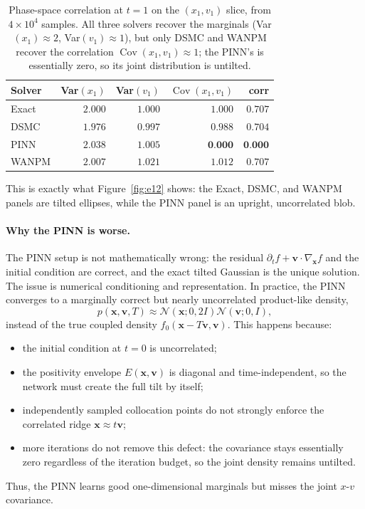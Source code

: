 \documentclass[11pt]{article}
\newcommand{\grad}{\nabla}
\newcommand{\vx}{\mathbf{x}}
\newcommand{\vv}{\mathbf{v}}
\theoremstyle{plain}
\begin{document}
\begin{table}[H]
\centering
\caption{Phase-space correlation at $t=1$ on the $(x_1,v_1)$ slice, from $4\times10^4$ samples.
All three solvers recover the marginals (Var$(x_1)\!\approx\!2$, Var$(v_1)\!\approx\!1$), but
only DSMC and WANPM recover the correlation $\operatorname{Cov}(x_1,v_1)\!\approx\!1$; the PINN's
is essentially zero, so its joint distribution is untilted.}
\label{tab:corr}
\small
\begin{tabular}{lrrrr}
\toprule
Solver & Var$(x_1)$ & Var$(v_1)$ & $\operatorname{Cov}(x_1,v_1)$ & corr\\
\midrule
Exact  & $2.000$ & $1.000$ & $1.000$  & $0.707$\\
DSMC   & $1.976$ & $0.997$ & $0.988$  & $0.704$\\
PINN   & $2.038$ & $1.005$ & $\textbf{0.000}$  & $\textbf{0.000}$\\
WANPM  & $2.007$ & $1.021$ & $1.012$  & $0.707$\\
\bottomrule
\end{tabular}
\end{table}

This is exactly what Figure~\ref{fig:e12} shows: the Exact, DSMC, and WANPM panels are tilted
ellipses, while the PINN panel is an upright, uncorrelated blob.


\paragraph{Why the PINN is worse.}
The PINN setup is not mathematically wrong: the residual
\(\partial_t f+\vv\cdot\grad_\vx f\) and the initial condition are correct, and the exact tilted Gaussian is the unique solution. The issue is numerical conditioning and representation. In practice, the PINN converges to a marginally correct but nearly uncorrelated product-like density,
$$
p(\vx,\vv,T)\approx \mathcal N(\vx;0,2I)\mathcal N(\vv;0,I),
$$
instead of the true coupled density \(f_0(\vx-T\vv,\vv)\). This happens because:
\begin{itemize}
    \item the initial condition at \(t=0\) is uncorrelated;
    \item the positivity envelope \(E(\vx,\vv)\) is diagonal and time-independent, so the network must create the full tilt by itself;
    \item independently sampled collocation points do not strongly enforce the correlated ridge \(\vx\approx t\vv\);
    \item more iterations do not remove this defect: the covariance stays essentially zero regardless of the iteration budget, so the joint density remains untilted.
\end{itemize}
Thus, the PINN learns good one-dimensional marginals but misses the joint \(x\)-\(v\) covariance.
\end{document}
